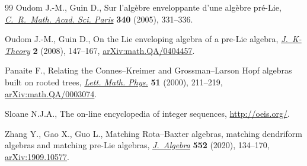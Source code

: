 \documentclass[10pt,a4paper]{amsart}
\numberwithin{equation}{section}
\begin{document}
\begin{thebibliography}{99}
Oudom J.-M., Guin D., Sur l'alg\`ebre enveloppante d'une alg\`ebre pr\'e-{L}ie,
 \href{https://doi.org/10.1016/j.crma.2005.01.010}{\textit{C.~R.~Math. Acad. Sci. Paris}} \textbf{340} (2005), 331--336.

Oudom J.-M., Guin D., On the {L}ie enveloping algebra of a pre-{L}ie algebra,
 \href{https://doi.org/10.1017/is008001011jkt037}{\textit{J.~K-Theory}} \textbf{2} (2008), 147--167, \href{https://arxiv.org/abs/math.QA/0404457}{arXiv:math.QA/0404457}.

Panaite F., Relating the {C}onnes--{K}reimer and {G}rossman--{L}arson {H}opf
 algebras built on rooted trees, \href{https://doi.org/10.1023/A:1007600216187}{\textit{Lett. Math. Phys.}} \textbf{51}
 (2000), 211--219, \href{https://arxiv.org/abs/math.QA/0003074}{arXiv:math.QA/0003074}.

Sloane N.J.A., The on-line encyclopedia of integer sequences,
 \url{http://oeis.org/}.

Zhang Y., Gao X., Guo L., Matching {R}ota--{B}axter algebras, matching
 dendriform algebras and matching pre-{L}ie algebras, \href{https://doi.org/10.1016/j.jalgebra.2020.02.011}{\textit{J.~Algebra}}
 \textbf{552} (2020), 134--170, \href{https://arxiv.org/abs/1909.10577}{arXiv:1909.10577}.

\end{thebibliography}
\end{document}
